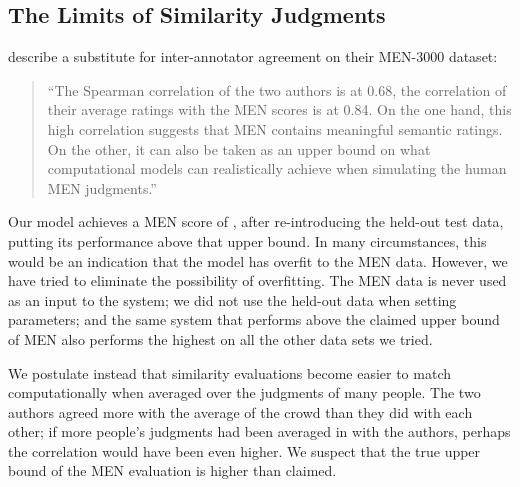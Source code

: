\documentclass[letterpaper]{article}
\begin{document}
%
%

\subsection{The Limits of Similarity Judgments}

 describe a substitute for
inter-annotator agreement on their MEN-3000 dataset:

\begin{quote}
``The Spearman correlation of the two authors is at 0.68, the correlation of their
average ratings with the MEN scores is at 0.84. On the one hand, this high
correlation suggests that MEN contains meaningful semantic ratings. On the
other, it can also be taken as an upper bound on what computational models can
realistically achieve when simulating the human MEN judgments.''
\end{quote}

Our model achieves a MEN score of \scoreMEN{}, after re-introducing the
held-out test data, putting its performance above that upper bound. In many
circumstances, this would be an indication that the model has overfit to the
MEN data. However, we have tried to eliminate the possibility of overfitting.
The MEN data is never used as an input to the system; we did not use the
held-out data when setting parameters; and the same system that performs above
the claimed upper bound of MEN also performs the highest on all the other data
sets we tried.

We postulate instead that similarity evaluations become easier to match
computationally when averaged over the judgments of many people. The two
authors agreed more with the average of the crowd than they did with each other;
if more people's judgments had been averaged in with the authors, perhaps the
correlation would have been even higher. We suspect that the true upper bound
of the MEN evaluation is higher than claimed.

\begin{CJK*}{UTF8}{min}

\end{CJK*}
\end{document}
